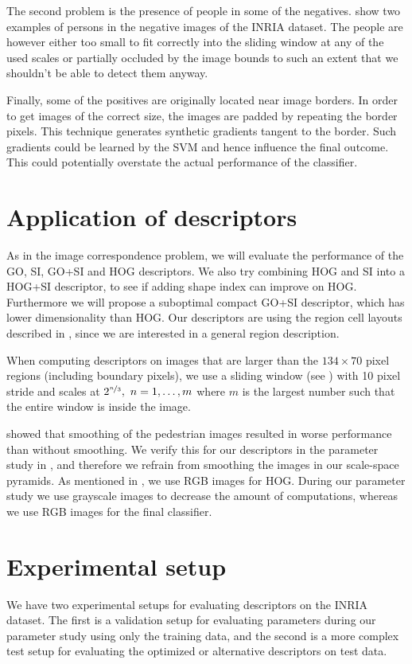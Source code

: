 \documentclass[thesis.tex]{subfiles}
\begin{document}
The second problem is the presence of people in some of the negatives.
 show two examples of persons in the negative images of the INRIA dataset. The people are however either too small to fit correctly into the sliding window at any of the used scales or partially occluded by the image bounds to such an extent that we shouldn't be able to detect them anyway.

Finally, some of the positives are originally located near image borders. In order to get images of the correct size, the images are padded by repeating the border pixels. This technique generates synthetic gradients tangent to the border. Such gradients could be learned by the SVM and hence influence the final outcome. This could potentially overstate the actual performance of the classifier.
%
\section{Application of descriptors}
\label{sec:inriaDescriptorApplication}
%
As in the image correspondence problem, we will evaluate the performance of the GO, SI, GO+SI and HOG descriptors. We also try combining HOG and SI into a HOG+SI descriptor, to see if adding shape index can improve on HOG. Furthermore we will propose a suboptimal compact GO+SI descriptor, which has lower dimensionality than HOG.
Our descriptors are using the region cell layouts described in , since we are interested in a general region description.

When computing descriptors on images that are larger than the $134 \times 70$ pixel regions (including boundary pixels), we use a sliding window (see ) with 10 pixel stride and scales at $2^{\nicefrac{n}{3}},~n=1,\hdots,m$ where $m$ is the largest number such that the entire window is inside the image. 

\citet{dalal2005histograms} showed that smoothing of the pedestrian images resulted in worse performance than without smoothing. We verify this for our descriptors in the parameter study in , and therefore we refrain from smoothing the images in our scale-space pyramids. As mentioned in , we use RGB images for HOG. During our parameter study we use grayscale images to decrease the amount of computations, whereas we use RGB images for the final classifier.
%
\section{Experimental setup}
\label{sec:inriaExperimentalSetup}
%
We have two experimental setups for evaluating descriptors on the INRIA dataset. The first is a validation setup for evaluating parameters during our parameter study using only the training data, and the second is a more complex test setup for evaluating the optimized or alternative descriptors on test data.
\end{document}
